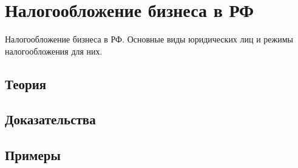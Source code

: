 
\section{Налогообложение бизнеса в РФ}
\label{sec:2.6.19-taxation-rf}

\begin{ticket}
Налогообложение бизнеса в РФ. Основные виды юридических лиц и режимы налогообложения для них.
\end{ticket}

\subsection*{Теория}

\subsection*{Доказательства}

\subsection*{Примеры}

